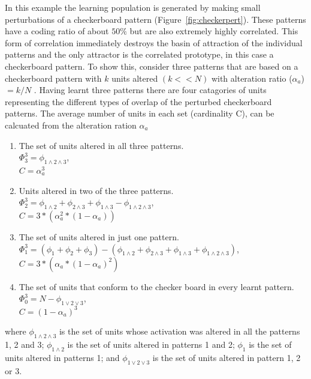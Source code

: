 In this example the learning population is generated by making small perturbations of a checkerboard pattern (Figure~\ref{fig:checkerpert}).  These patterns have a coding ratio of about $50\%$ but are also extremely highly correlated.  This form of correlation immediately destroys the basin of attraction of the individual patterns and the only attractor is the correlated prototype, in this case a checkerboard pattern.  To show this, consider three patterns that are based on a checkerboard pattern with $k$ units altered $(k<<N)$ with alteration ratio ($\alpha_{a}$) $= k/N$ .  Having learnt three patterns there are four catagories of units representing the different types of overlap of the perturbed checkerboard patterns.  The average number of units in each set (cardinality C), can be calcuated from the alteration ration $\alpha_{a}$
\begin{enumerate}
\item The set of units altered in all three patterns. \\
  \hspace{1cm}$\Phi^{3}_{3}=\phi_{1\wedge2\wedge3}$, \\
  \hspace{1cm}$C = \alpha_{a}^3$
\item Units altered in two of the three patterns. \\
  \hspace{1cm}$\Phi^{3}_{2}=\phi_{1\wedge2}+\phi_{2\wedge3}+\phi_{1\wedge3} -
  \phi_{1\wedge2\wedge3}$, \\ 
  \hspace{1cm}$C = 3*(\alpha_{a}^2*(1-\alpha_{a}))$
\item The set of units altered in just one pattern. \\
  \hspace{1cm}$\Phi^{3}_{1}=(\phi_{1} +\phi_{2} + \phi_{3})   
  -(\phi_{1\wedge2}+\phi_{2\wedge3}+\phi_{1\wedge3}+\phi_{1\wedge2\wedge3})$, \\
  \hspace{1cm}$C = 3*(\alpha_{a}*(1-\alpha_{a})^2)$
\item The set of units that conform to the checker board in every learnt pattern.\\
  \hspace{1cm}$\Phi^{3}_{0}=N-\phi_{1\vee 2\vee 3}$, \\
  \hspace{1cm}$C = (1-\alpha_{a})^3$
\end{enumerate}
where $\phi_{1\wedge2\wedge3}$ is the set of units whose activation was altered in all the patterns 1, 2 and 3;
 $\phi_{1\wedge2}$ is the set of units altered in patterns 1 and 2;
 $\phi_{1}$ is the set of units altered in patterns 1; and
 $\phi_{1\vee2\vee3}$ is the set of units altered in pattern 1, 2 or 3.


